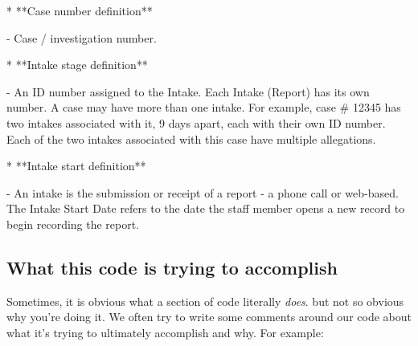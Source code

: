\documentclass[
  letterpaper,
  DIV=11,
  numbers=noendperiod]{scrreprt}
\newenvironment{Shaded}{\begin{snugshade}}{\end{snugshade}}
\newcommand{\CommentTok}[1]{\textcolor[rgb]{0.37,0.37,0.37}{#1}}
\newcommand{\DecValTok}[1]{\textcolor[rgb]{0.68,0.00,0.00}{#1}}
\newcommand{\ErrorTok}[1]{\textcolor[rgb]{0.68,0.00,0.00}{#1}}
\newcommand{\FunctionTok}[1]{\textcolor[rgb]{0.28,0.35,0.67}{#1}}
\newcommand{\NormalTok}[1]{\textcolor[rgb]{0.00,0.23,0.31}{#1}}
\newcommand{\SpecialCharTok}[1]{\textcolor[rgb]{0.37,0.37,0.37}{#1}}
\begin{document}
\begin{Shaded}
\begin{Highlighting}[]
\SpecialCharTok{*} \ErrorTok{**}\NormalTok{Case number definition}\SpecialCharTok{**}

    \SpecialCharTok{{-}}\NormalTok{ Case }\SpecialCharTok{/}\NormalTok{ investigation number.}

\SpecialCharTok{*} \ErrorTok{**}\NormalTok{Intake stage definition}\SpecialCharTok{**}

    \SpecialCharTok{{-}}\NormalTok{ An ID number assigned to the Intake. Each }\FunctionTok{Intake}\NormalTok{ (Report) has its }
\NormalTok{      own number. A case may have more than one intake. For example, case }\CommentTok{\# 12345 }
\NormalTok{      has two intakes associated with it, }\DecValTok{9}\NormalTok{ days apart, each with their own ID }
\NormalTok{      number. Each of the two intakes associated with this case have multiple }
\NormalTok{      allegations.}

\SpecialCharTok{*} \ErrorTok{**}\NormalTok{Intake start definition}\SpecialCharTok{**}

    \SpecialCharTok{{-}}\NormalTok{ An intake is the submission or receipt of a report }\SpecialCharTok{{-}}\NormalTok{ a phone call or }
\NormalTok{      web}\SpecialCharTok{{-}}\NormalTok{based. The Intake Start Date refers to the date the staff member }
\NormalTok{      opens a new record to begin recording the report.}
\end{Highlighting}
\end{Shaded}

\subsection{What this code is trying to
accomplish}\label{what-this-code-is-trying-to-accomplish}

Sometimes, it is obvious what a section of code literally \emph{does}.
but not so obvious why you're doing it. We often try to write some
comments around our code about what it's trying to ultimately accomplish
and why. For example:
\end{document}
